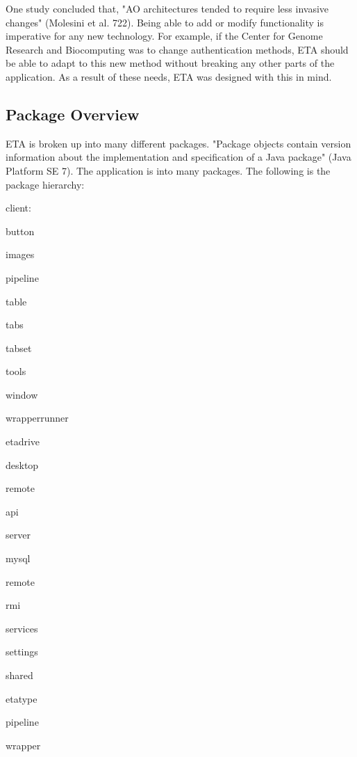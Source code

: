 \documentclass[a4paper,12pt]{article}
\begin{document}
One study concluded that, "AO architectures tended to require less invasive changes" (Molesini et al. 722). Being able to add or modify functionality is imperative for any new technology. For example, if the Center for Genome Research and Biocomputing was to change authentication methods, ETA should be able to adapt to this new method without breaking any other parts of the application. As a result of these needs, ETA was designed with this in mind.

\subsection{Package Overview}
ETA is broken up into many different packages. "Package objects contain version information about the implementation and specification of a Java package" (Java Platform SE 7). The application is into many packages. The following is the package hierarchy:
\begin{compactenum}
    \item client:
    \begin{compactenum}
        \item button
        \item images
        \item pipeline
        \item table
        \item tabs
        \item tabset
        \item tools
        \item window
        \item wrapperrunner
    \end{compactenum}
    \item etadrive
    \begin{compactenum}
        \item desktop
    \end{compactenum}
    \item remote
    \begin{compactenum}
        \item api
    \end{compactenum}
    \item server
    \begin{compactenum}
        \item mysql
        \item remote
        \item rmi
        \item services
        \item settings
    \end{compactenum}
    \item shared
    \begin{compactenum}
        \item etatype
        \item pipeline
        \item wrapper
    \end{compactenum}
\end{compactenum}
\end{document}
